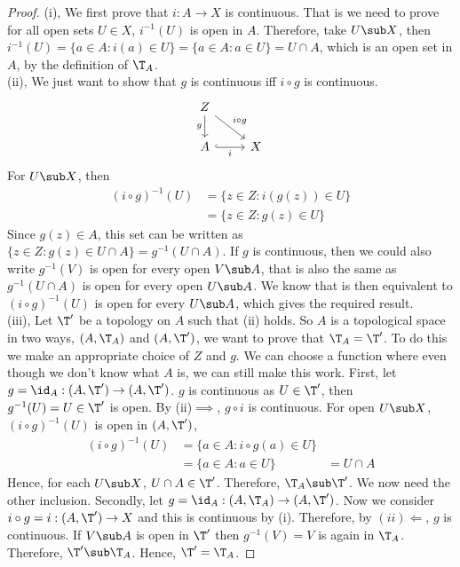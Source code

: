 \begin{proof}
  (i), We first prove that $i : A \to X$ is continuous. That is we need to prove for all open sets $U \in X$, $i^{-1}(U)$ is open in $A$. Therefore, take $U \sub X$, then $i^{-1}(U) = \{a \in A : i(a) \in U\} = \{a \in A : a \in U\} = U \cap A$, which is an open set in $A$, by the definition of $\T_A$.\\

  \noindent
  (ii), We just want to show that $g$ is continuous iff $i \circ g$ is continuous.
    \[\begin{tikzcd}
  Z \\ A & X
  \arrow["{i \circ g}", from=1-1, to=2-2]
  \arrow["i"', hook, from=2-1, to=2-2]
  \arrow["g"', from=1-1, to=2-1]
  \end{tikzcd}\]
  For $U \sub X$, then
  \begin{align*}
    (i\circ g)^{-1}(U) &= \{z \in Z : i(g(z)) \in U\} \\
    &= \{z \in Z : g(z) \in U\}
  \end{align*}
  Since $g(z) \in A$, this set can be written as $\{z \in Z : g(z) \in U \cap A\} = g^{-1}(U \cap A)$. If $g$ is continuous, then we could also write $g^{-1}(V)$ is open for every open $V \sub A$, that is also the same as $g^{-1}(U \cap A)$ is open for every open $U \sub A$. We know that is then equivalent to $(i \circ g)^{-1}(U)$ is open for every $U \sub A$, which gives the required result.\\

  \noindent
  (iii), Let $\T'$ be a topology on $A$ such that (ii) holds. So $A$ is a topological space in two ways, $(A, \T_A)$ and $(A, \T')$, we want to prove that $\T_A = \T'$. To do this we make an appropriate choice of $Z$ and $g$. We can choose a function where even though we don't know what $A$ is, we can still make this work. First, let $g = \id_A : (A, \T') \to (A, \T')$. $g$ is continuous as $U \in \T'$, then $g^{-1}(U) = U \in \T'$ is open. By (ii)$\implies$,
  $g \circ i$ is continuous. For open $U \sub X$, $(i \circ g)^{-1}(U)$ is open in $(A, \T')$,
  \begin{align*}
    (i \circ g)^{-1}(U) &= \{ a \in A : i \circ g (a) \in U \}\\
    &= \{a \in A : a \in U\}
    &= U \cap A
  \end{align*}
  Hence, for each $U \sub X$, $U \cap A \in \T'$. Therefore, $\T_A \sub \T'$. We now need the other inclusion. Secondly, let $g = \id_A : (A, \T_A) \to (A, \T')$. Now we consider $i \circ g = i : (A, \T') \to X$ and this is continuous by (i). Therefore, by $(ii) \Leftarrow$, $g$ is continuous. If $V \sub A$ is open in $\T'$ then $g^{-1}(V) = V$ is again in $\T_A$. Therefore, $\T' \sub \T_A$. Hence, $\T' = \T_A$.
\end{proof}

